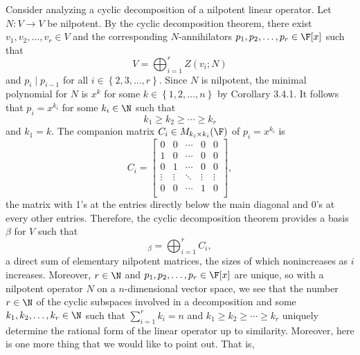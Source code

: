 \documentclass[math_245.tex]{subfiles}
\begin{document}
    \begin{remark}
        Consider analyzing a cyclic decomposition of a nilpotent linear operator. Let $N:V\to V$ be nilpotent. By the cyclic decomposition theorem, there exist $v_1, v_2, \ldots,v_r\in V$ and the corresponding $N$-annihilators $p_1,p_2,\ldots,p_r\in\F[x]$ such that
        \begin{equation*}
            V = \bigoplus^{r}_{i=1} Z\left( v_i;N \right) 
        \end{equation*}
        and $p_i\mid p_{i-1}$ for all $i\in \left\lbrace 2,3,\ldots,r \right\rbrace$. Since $N$ is nilpotent, the minimal polynomial for $N$ is $x^k$ for some $k\in \left\lbrace 1,2,\ldots,n \right\rbrace$ by Corollary 3.4.1. It follows that $p_i = x^{k_i}$ for some $k_i\in\N$ such that
        \begin{equation*}
            k_1\geq k_2\geq\cdots\geq k_r
        \end{equation*}
        and $k_1=k$. The companion matrix $C_i\in M_{k_i\times k_i}(\F)$ of $p_i=x^{k_i}$ is
        \begin{equation*}
            C_i = 
            \begin{bmatrix}
                0 & 0 & \cdots & 0 & 0 \\
                1 & 0 & \cdots & 0 & 0 \\
                0 & 1 & \cdots & 0 & 0 \\
                \vdots & \vdots & \ddots & \vdots & \vdots \\
                0 & 0 & \cdots & 1 & 0 \\
            \end{bmatrix},
        \end{equation*}
        the matrix with 1's at the entries directly below the main diagonal and 0's at every other entries. Therefore, the cyclic decomposition theorem provides a basis $\beta$ for $V$ such that
        \begin{equation*}
            [N]_\beta = \bigoplus^{r}_{i=1} C_i,
        \end{equation*}
        a direct sum of elementary nilpotent matrices, the sizes of which nonincreases as $i$ increases. Moreover, $r\in\N$ and $p_1,p_2,\ldots,p_r\in\F[x]$ are unique, so with a nilpotent operator $N$ on a $n$-dimensional vector space, we see that the number $r\in\N$ of the cyclic subspaces involved in a decomposition and some $k_1,k_2,\ldots,k_r\in\N$ such that $\sum^{r}_{i=1} k_i=n$ and $k_1\geq k_2\geq \cdots\geq k_r$ uniquely determine the rational form of the linear operator up to similarity. Moreover, here is one more thing that we would like to point out. That is,

\end{remark}
\end{document}
